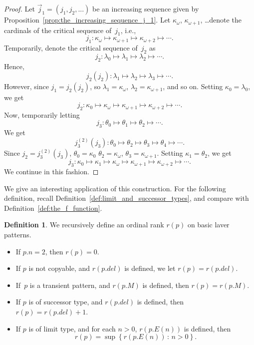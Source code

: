 \documentclass{article}
\theoremstyle{definition}
\newtheorem{definition}[lemma]{Definition}
\theoremstyle{remark}
\begin{document}
\begin{proof}
  Let $\vec{j}_1=(j_1,j_2,...)$ be an increasing sequence given by Proposition~\ref{prop:the_increasing_sequence_j_1}. Let $\kappa_\omega$, $\kappa_{\omega+1}$, \dots denote the cardinals of the critical sequence of~$j_1$, i.e., 
\[
  j_1:\kappa_\omega\mapsto\kappa_{\omega+1}\mapsto\kappa_{\omega+2}\mapsto \cdots.
\]
 Temporarily, denote the critical sequence of~$j_2$ as
 \[
  j_2:\lambda_0\mapsto\lambda_{1}\mapsto \lambda_2 \mapsto \cdots.
\] Hence, 
   \[
  j_2(j_2):\lambda_1\mapsto\lambda_{2}\mapsto \lambda_3 \mapsto \cdots.
\]
However, since $j_1 = j_2(j_2)$, so $\lambda_1 = \kappa_\omega$, $\lambda_2 = \kappa_{\omega+1}$, and so on. Setting $\kappa_0 = \lambda_0$, we get
\[
  j_2:\kappa_0 \mapsto \kappa_\omega\mapsto\kappa_{\omega+1}\mapsto\kappa_{\omega+2}\mapsto \cdots.
\] 
Now, temporarily letting \[
  j_3:\theta_0\mapsto\theta_{1}\mapsto \theta_2 \mapsto \cdots.
\] We get
\[
  j_3^{(2)}(j_3):\theta_0 \mapsto\theta_{2}\mapsto \theta_3 \mapsto \theta_4 \mapsto \cdots.
\]
Since $j_2 = j_3^{(2)}(j_3)$, $\theta_0 = \kappa_0$ $\theta_2 = \kappa_\omega$, $\theta_3 = \kappa_{\omega+1}$. Setting $\kappa_1 = \theta_2$, we get
\[
  j_3:\kappa_0 \mapsto \kappa_1 \mapsto \kappa_\omega\mapsto\kappa_{\omega+1}\mapsto\kappa_{\omega+2}\mapsto \cdots.
\]
We continue in this fashion. 
\end{proof}


We give an interesting application of this construction. For the following definition, recall Definition~\ref{def:limit_and_successor_types}, and compare with Definition~\ref{def:the_f_function}.

\begin{definition} \label{def:I2:rank_of_blp}
    We recursively define an ordinal rank $r(p)$ on basic laver patterns.
    \begin{itemize}
      \item If $p.n=2$, then $r(p)=0$.
      \item If $p$ is not copyable, and  $r(p.del)$ is defined, we let $r(p)=r(p.del)$. 
      \item If~$p$ is a transient pattern, and $r(p.M)$ is defined, then $r(p)=r(p.M)$.
      \item If $p$ is of successor type, and $r(p.del)$ is defined, then $r(p)=r(p.del)+1$.
      \item If $p$ is of limit type, and for each $n>0$, $r(p.E(n))$ is defined, then 
      \[
        r(p) = \sup \left\{ r(p.E(n)) \,:\,  n>0 \right\}. 
      \]
    \end{itemize}
\end{definition}
\end{document}
